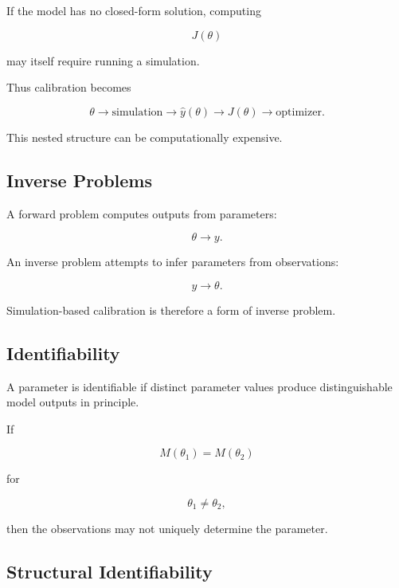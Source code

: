 If the model has no closed-form solution, computing

\[
J(\theta)
\]

may itself require running a simulation.

Thus calibration becomes

\[
\boxed{
\theta
\rightarrow
\text{simulation}
\rightarrow
\widehat{y}(\theta)
\rightarrow
J(\theta)
\rightarrow
\text{optimizer}.
}
\]

This nested structure can be computationally expensive.

\subsection{Inverse Problems}
\label{subsec:simulation-inverse-problems}

A forward problem computes outputs from parameters:

\[
\boxed{
\theta
\longrightarrow
y.
}
\]

An inverse problem attempts to infer parameters from observations:

\[
\boxed{
y
\longrightarrow
\theta.
}
\]

Simulation-based calibration is therefore a form of inverse problem.

\subsection{Identifiability}
\label{subsec:simulation-identifiability}

A parameter is identifiable if distinct parameter values produce
distinguishable model outputs in principle.

If

\[
\boxed{
M(\theta_1)
=
M(\theta_2)
}
\]

for

\[
\theta_1\neq\theta_2,
\]

then the observations may not uniquely determine the parameter.

\subsection{Structural Identifiability}
\label{subsec:structural-identifiability}

